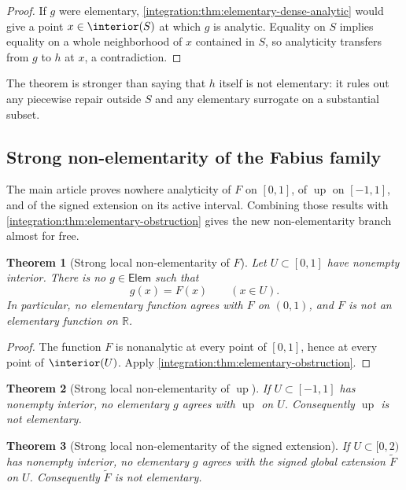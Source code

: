\documentclass[11pt,oneside]{article}
\newtheorem{theorem}{Theorem}[section]
\theoremstyle{definition}
\theoremstyle{remark}
\newcommand{\R}{\mathbb R}
\newcommand{\Up}{\operatorname{up}}
\begin{document}
\begin{proof}
If $g$ were elementary, \cref{integration:thm:elementary-dense-analytic} would give a point
$x\in\interior(S)$ at which $g$ is analytic.  Equality on $S$ implies equality on a whole
neighborhood of $x$ contained in $S$, so analyticity transfers from $g$ to $h$ at $x$, a
contradiction.
\end{proof}

The theorem is stronger than saying that $h$ itself is not elementary: it rules out any
piecewise repair outside $S$ and any elementary surrogate on a substantial subset.

\subsection{Strong non-elementarity of the Fabius family}
\label{integration:sec:not-elementary}

The main article proves nowhere analyticity of $F$ on $[0,1]$, of $\Up$ on $[-1,1]$, and of
the signed extension on its active interval.  Combining those results with
\cref{integration:thm:elementary-obstruction} gives the new non-elementarity branch almost for free.

\begin{theorem}[Strong local non-elementarity of $F$]
\label{integration:thm:fabius-strong-non-elementary}
Let $U\subset[0,1]$ have nonempty interior.  There is no $g\in\mathsf{Elem}$ such that
\begin{equation}
 g(x)=F(x)\qquad(x\in U).
 \label{integration:eq:elementary-F-agreement}
\end{equation}
In particular, no elementary function agrees with $F$ on $(0,1)$, and $F$ is not an
elementary function on $\R$.
\end{theorem}

\begin{proof}
The function $F$ is nonanalytic at every point of $[0,1]$, hence at every point of
$\interior(U)$.  Apply \cref{integration:thm:elementary-obstruction}.
\end{proof}

\begin{theorem}[Strong local non-elementarity of $\Up$]
\label{integration:thm:up-strong-non-elementary}
If $U\subset[-1,1]$ has nonempty interior, no elementary $g$ agrees with $\Up$ on $U$.
Consequently $\Up$ is not elementary.
\end{theorem}

\begin{theorem}[Strong local non-elementarity of the signed extension]
\label{integration:thm:global-strong-non-elementary}
If $U\subset[0,2)$ has nonempty interior, no elementary $g$ agrees with the signed global
extension $\widetilde F$ on $U$.  Consequently $\widetilde F$ is not elementary.
\end{theorem}
\end{document}
